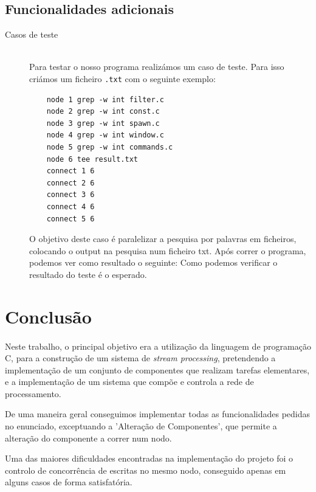 \documentclass[12pt]{article}
\begin{document}
\newpage
\subsection{Funcionalidades adicionais}

\begin{description} 
\item[Casos de teste] \hfill \\
Para testar o nosso programa realizámos um caso de teste. Para isso criámos um ficheiro \texttt{.txt} com o seguinte exemplo:
\begin{verbatim}
    node 1 grep -w int filter.c
    node 2 grep -w int const.c
    node 3 grep -w int spawn.c
    node 4 grep -w int window.c
    node 5 grep -w int commands.c
    node 6 tee result.txt
    connect 1 6
    connect 2 6
    connect 3 6
    connect 4 6
    connect 5 6
\end{verbatim}
O objetivo deste caso é paralelizar a pesquisa por palavras em ficheiros, colocando o output na pesquisa num ficheiro txt. 
Após correr o programa, podemos ver como resultado o seguinte: 
Como podemos verificar o resultado do teste é o esperado.



\end{description}

\newpage

\section{Conclusão} 
\paragraph{}
Neste trabalho, o principal objetivo era a utilização da linguagem de programação C, para a construção de um sistema de \textit{stream processing}, pretendendo a implementação de um conjunto de componentes que realizam tarefas elementares, e a implementação de um sistema que compõe e controla a rede de processamento.

De uma maneira geral conseguimos implementar todas as funcionalidades pedidas no enunciado, exceptuando a 'Alteração de Componentes', que permite a alteração do componente a correr num nodo. 

Uma das maiores dificuldades encontradas na implementação do projeto foi o controlo de concorrência de escritas no mesmo nodo, conseguido apenas em alguns casos de forma satisfatória. 


\end{document}
